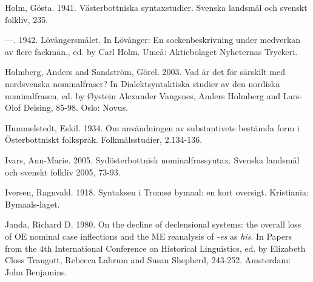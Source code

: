 \begin{styleBodytextC}
Holm, Gösta. 1941. Västerbottniska syntaxstudier. Svenska landsmål och svenskt folkliv, 235.

\end{styleBodytextC}

\begin{styleBodytextC}
—. 1942. Lövångersmålet. In Lövånger: En sockenbeskrivning under medverkan av flere fackmän., ed. by Carl Holm. Umeå: Aktiebolaget Nyheternas Tryckeri.

\end{styleBodytextC}

\begin{styleBodytextC}
Holmberg, Anders and Sandström, Görel. 2003. Vad är det för särskilt med nordsvenska nominalfraser? In Dialektsyntaktiska studier av den nordiska nominalfrasen, ed. by Øystein Alexander Vangsnes, Anders Holmberg and Lars-Olof Delsing, 85-98. Oslo: Novus.

\end{styleBodytextC}

\begin{styleBodytextC}
Hummelstedt, Eskil. 1934. Om användningen av substantivets bestämda form i Österbottniskt folkspråk. Folkmålsstudier, 2.134-136.

\end{styleBodytextC}

\begin{styleBodytextC}
Ivars, Ann-Marie. 2005. Sydösterbottnisk nominalfrassyntax. Svenska landsmål och svenskt folkliv 2005, 73-93.

\end{styleBodytextC}

\begin{styleBodytextC}
Iversen, Ragnvald. 1918. Syntaksen i Tromsø bymaal: en kort oversigt. Kristiania: Bymaals-laget.

\end{styleBodytextC}

\begin{styleBodytextC}
Janda, Richard D. 1980. On the decline of declensional systems: the overall loss of OE nominal case inflections and the ME reanalysis of \textit{{}-es} as \textit{his}. In Papers from the 4th International Conference on Historical Linguistics, ed. by Elizabeth Closs Traugott, Rebecca Labrum and Susan Shepherd, 243-252. Amsterdam: John Benjamins.

\end{styleBodytextC}

